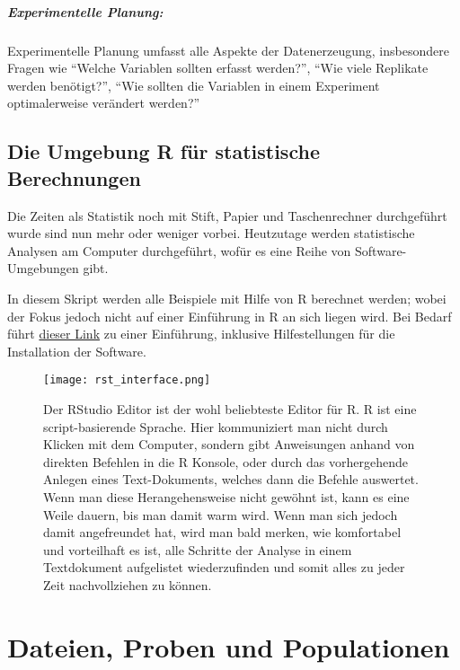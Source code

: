 \documentclass[a4paper,twoside]{tufte-book}\usepackage[]{graphicx}\usepackage[]{color}
\begin{document}
	\paragraph{Experimentelle Planung:} Experimentelle Planung umfasst alle Aspekte der Datenerzeugung, insbesondere Fragen wie "`Welche Variablen sollten erfasst werden?"', "`Wie viele Replikate werden benötigt?"', "`Wie sollten die Variablen in einem Experiment optimalerweise verändert werden?"'
	
	
	\section{Die Umgebung R für statistische Berechnungen}
	
	Die Zeiten als Statistik noch mit Stift, Papier und Taschenrechner durchgeführt wurde sind nun mehr oder weniger vorbei. Heutzutage werden statistische Analysen am Computer durchgeführt, wofür es eine Reihe von Software-Umgebungen gibt.
	
	In diesem Skript werden alle Beispiele mit Hilfe von R berechnet werden; wobei der Fokus jedoch nicht auf einer Einführung in R an sich liegen wird. Bei Bedarf führt  \href{http://biometry.github.io/APES/R/R10-gettingStarted.html}{dieser Link} zu einer Einführung, inklusive Hilfestellungen für die Installation der Software.
	
	\begin{figure}[]
		\begin{center}
			\texttt{[image: rst\_interface.png]}
			\caption{Der RStudio Editor ist der wohl beliebteste Editor für R. R ist eine script-basierende Sprache. Hier kommuniziert man nicht durch Klicken mit dem Computer, sondern gibt Anweisungen anhand von direkten Befehlen in die R Konsole, oder durch das vorhergehende Anlegen eines Text-Dokuments, welches dann die Befehle auswertet. Wenn man diese Herangehensweise nicht gewöhnt ist, kann es eine Weile dauern, bis man damit warm wird. Wenn man sich jedoch damit angefreundet hat, wird man bald merken, wie komfortabel und vorteilhaft es ist, alle Schritte der Analyse in einem Textdokument aufgelistet wiederzufinden und somit alles zu jeder Zeit nachvollziehen zu können.}
			\label{fig: Rstudio}
		\end{center}
	\end{figure}
	
	
	
	\chapter{Dateien, Proben und Populationen}
	
\end{document}
